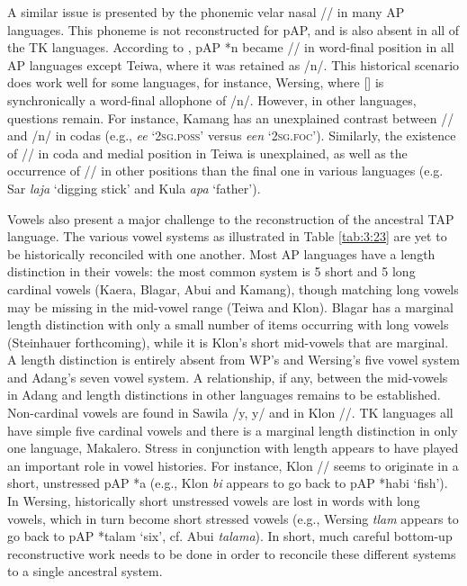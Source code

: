 A similar issue is presented by the phonemic velar nasal /{\ng}/ in many AP languages. This phoneme is not reconstructed for pAP, and is also absent in all of the TK languages. According to \citet{HoltonRobinsonTVhistory}, pAP *n became /{\ng}/ in word-final position in all AP languages except Teiwa, where it was retained as /n/. This historical scenario does work well for some languages, for instance, Wersing, where [{\ng}] is synchronically a word-final allophone of /n/. However, in other languages, questions remain. For instance, Kamang has an unexplained contrast between /{\ng}/ and /n/ in codas (e.g., \textit{ee{\ng}} `\textsc{2sg.poss'} versus \textit{een} `\textsc{2sg.foc'}). Similarly, the existence of /{\ng}/ in coda and medial position in Teiwa is unexplained, as well as the occurrence of /{\ng}/ in other positions than the final one in various languages (e.g. Sar \textit{la{\ng}ja} `digging stick' and Kula \textit{{\ng}apa} `father'). 

Vowels also present a major challenge to the reconstruction of the ancestral TAP language. The various vowel systems as illustrated in Table \ref{tab:3:23} are yet to be historically reconciled with one another. Most AP languages have a length distinction in their vowels: the most common system is 5 short and 5 long cardinal vowels (Kaera, Blagar, Abui and Kamang), though matching long vowels may be missing in the mid-vowel range (Teiwa and Klon). Blagar has a marginal length distinction with only a small number of items occurring with long vowels (Steinhauer forthcoming), while it is Klon's short mid-vowels that are marginal. A length distinction is entirely absent from WP's and Wersing's five vowel system and Adang's seven vowel system. A relationship, if any, between the mid-vowels in Adang and length distinctions in other languages remains to be established. Non-cardinal vowels are found in Sawila /y, y{\textlengthmark}/ and in Klon /{\textschwa}/. TK languages all have simple five cardinal vowels and there is a marginal length distinction in only one language, Makalero. Stress in conjunction with length appears to have played an important role in vowel histories. For instance, Klon /{\textschwa}/ seems to originate in a short, unstressed pAP *a (e.g., Klon \textit{{\textschwa}bi} appears to go back to pAP *ha{\textprimstress}bi `fish'). In Wersing, historically short unstressed vowels are lost in words with long vowels, which in turn become short stressed vowels (e.g., Wersing \textit{tlam} appears to go back to pAP *tala{\textlengthmark}m `six', cf. Abui \textit{tala{\textlengthmark}ma}). In short, much careful bottom-up reconstructive work needs to be done in order to reconcile these different systems to a single ancestral system.
 

